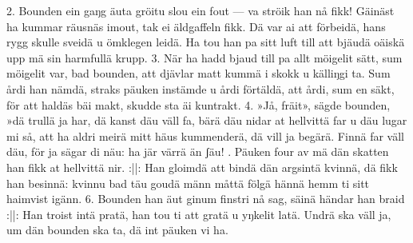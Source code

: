 \setlength{\columnsep}{0.2cm}
\begin{multicols}{2}
2.  Bounden ein gaŋg äuta gröitu slou ein fout —
    va ströik han nå fikk!
    Gäinäst ha kummar räusnäs imout,
    tak ei äldgaffeln fikk.
    Dä var ai att förbeidä,
    hans rygg skulle sveidä
    u ömklegen leidä.
    Ha tou han pa sitt luft
    till att bjäudä oäiskä upp
    mä sin harmfullä krupp.
3.  När ha hadd bjaud till pa allt möigelit sätt,
    sum möigelit var,
    bad bounden, att djävlar matt kummä i skokk
    u källiŋgi ta.
    Sum årdi han nämdä,
    straks päuken instämde
    u årdi förtäldä,
    att årdi, sum en säkt,
    för att haldäs bäi makt,
    skudde sta äi kuntrakt.
4.  »Jå, fräit», sägde bounden, »dä trullä ja har,
    dä kanst däu väll fa,
    bärä däu nidar at hellvittä far
    u däu lugar mi så,
    att ha aldri meirä
    mitt häus kummenderä,
    dä vill ja begärä.
    Finnä far väll däu,
    för ja sägar di näu:
    ha jär värrä än ʃäu!
\vfill{}.  Päuken four av mä dän skatten han fikk
    at hellvittä nir. :||:
    Han gloimdä att bindä dän argsintä kvinnä,
    dä fikk han besinnä:
    kvinnu bad täu goudä männ
    måttä fölgä hännä hemm
    ti sitt haimvist igänn.
6.  Bounden han äut ginum finstri nå sag,
    säinä händar han braid :||:
    Han troist intä pratä,
    han tou ti att gratä
    u yŋkelit latä.
    Undrä ska väll ja,
    um dän bounden ska ta,
    dä int päuken vi ha.
\end{multicols}
